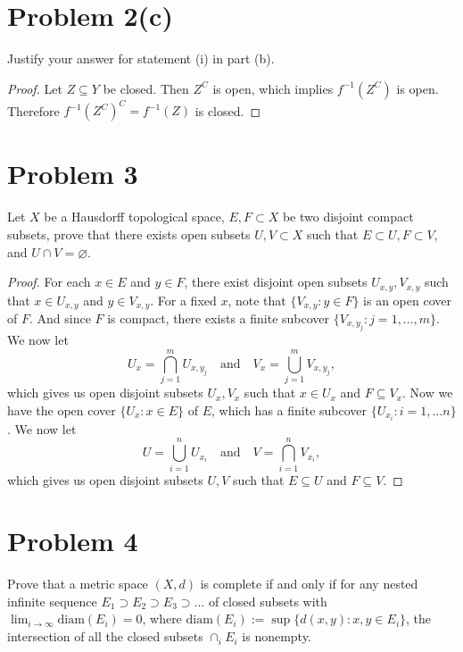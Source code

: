 \documentclass[12pt]{article}
\newenvironment{problem}
    {\begin{lrbox}{\mybox}\begin{minipage}{\textwidth-10pt}}
    {\end{minipage}\end{lrbox}\framebox[6.5in]{\usebox{\mybox}}}
\newcommand{\isp}[1]{\quad\text{#1}\quad}
\let\emptyset\varnothing
\newcommand{\diam}{\text{diam}}
\begin{document}
\section*{Problem 2(c)}
\begin{problem}
    Justify your answer for statement (i) in part (b).
\end{problem}

\begin{proof}
    Let $Z\subseteq Y$ be closed. Then $Z^C$ is open, which implies $f^{-1}(Z^C)$ is open. Therefore $f^{-1}(Z^C)^C=f^{-1}(Z)$ is closed.
    
\end{proof}

\newpage
\section*{Problem 3}
\begin{problem}
    Let $X$ be a Hausdorff topological space, $E,F\subset X$ be two disjoint compact subsets, prove that there exists open subsets $U,V\subset X$ such that $E\subset U, F\subset V$, and $U\cap V=\emptyset$.
\end{problem}

\begin{proof}
    For each $x\in E$ and $y\in F$, there exist disjoint open subsets $U_{x,y},V_{x,y}$ such that $x\in U_{x,y}$ and $y\in V_{x,y}$. For a fixed $x$, note that $\{V_{x,y} : y\in F\}$ is an open cover of $F$. And since $F$ is compact, there exists a finite subcover $\{V_{x,y_j} : j=1,\dots,m\}$. We now let
    \[U_x = \bigcap_{j=1}^mU_{x,y_j} \isp{and} V_x = \bigcup_{j=1}^mV_{x,y_j},\]
    which gives us open disjoint subsets $U_x,V_x$ such that $x\in U_x$ and $F\subseteq V_x$. Now we have the open cover $\{U_x : x\in E\}$ of $E$, which has a finite subcover $\{U_{x_i} : i=1,\dots n\}$. We now let
    \[U = \bigcup_{i=1}^nU_{x_i} \isp{and} V = \bigcap_{i=1}^nV_{x_i},\]
    which gives us open disjoint subsets $U,V$ such that $E\subseteq U$ and $F\subseteq V$.
    
\end{proof}

\section*{Problem 4}
\begin{problem}
    Prove that a metric space $(X, d)$ is complete if and only if for any nested infinite sequence $E_1 \supset E_2 \supset E_3 \supset \dots$ of closed subsets with $\lim_{i\to\infty} \diam(E_i) = 0$, where $\diam(E_i) := \sup\{d(x, y) : x, y \in E_i\}$, the intersection of all the closed subsets $\cap_iE_i$ is nonempty.
\end{problem}
\end{document}
